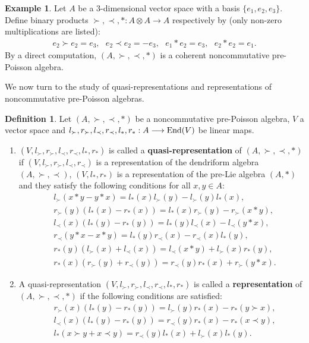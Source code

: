 \documentclass[12pt]{amsart}
\theoremstyle{definition}
\newtheorem{defi}[thm]{Definition}
\newtheorem{ex}[thm]{Example}
\begin{document}
\begin{ex} \label{Ae1}
Let $A$ be a 3-dimensional vector space with a basis $\{e_1,e_2,e_3\}$.
Define binary products $\succ,\prec,\ast:A\otimes A \longrightarrow A$ respectively by
 (only non-zero multiplications are listed):
 \begin{align*}
e_2\succ e_2=e_3, \ \ \  e_2\prec e_2=-e_3,\ \ \
e_1\ast e_2=e_3, \ \ \ e_2\ast e_2=e_1.
	\end{align*}
By a direct computation, $(A,\succ,\prec,\ast)$ is a coherent noncommutative pre-Poisson algebra.
\end{ex}

We now turn to the study of quasi-representations and representations of noncommutative pre-Poisson algebras.

\begin{defi} 
Let $(A,\succ,\prec,\ast)$ be a noncommutative pre-Poisson algebra,
$V$ a vector space and $l_{\succ},r_{\succ},l_{\prec},r_{\prec},l_{\ast},r_{\ast}: A
		\longrightarrow \hbox{End} (V)$ be linear maps. 
\begin{enumerate}
	\item
		$(V,l_{\succ},r_{\succ},l_{\prec},r_{\prec},l_{\ast},r_{\ast})$ is called a
		{\bf quasi-representation} of $(A,\succ,\prec,\ast)$ if $(V,l_{\succ},r_{\succ},l_{\prec},r_{\prec})$ is
		a representation of the dendriform algebra $(A,\succ,\prec)$, $(V,l_{\ast},r_{\ast})$ is a representation 
of the pre-Lie algebra
		$(A,\ast)$ and they satisfy the following conditions for all $x,y\in A$:
		\begin{align}&\label{r1}l_{\succ}(x\ast y-y\ast x)=l_{\ast}(x)l_{\succ}(y)-l_{\succ}(y)l_{\ast}(x),\\&
		\label{r2}r_{\succ}(y)(l_{\ast}(x)-r_{\ast}(x))=l_{\ast}(x)r_{\succ}(y)-r_{\succ}(x\ast y),\\&
		\label{r3}l_{\prec}(x)(l_{\ast}(y)-r_{\ast}(y))=l_{\ast}(y)l_{\prec}(x)-l_{\prec}(y\ast x),\\&
		\label{r4}r_{\prec}(y\ast x-x\ast y)=l_{\ast}(y)r_{\prec}(x)-r_{\prec}(x)l_{\ast}(y),
	\\&\label{r5}r_{\ast}(y)(l_{\succ}(x)+l_{\prec}(x))=l_{\prec}(x\ast y)+l_{\succ}(x)r_{\ast}(y),
\\&\label{r6}r_{\ast}(x)(r_{\succ}(y)+r_{\prec}(y))=r_{\prec}(y)r_{\ast} (x)+r_{\succ}(y\ast x).\end{align}
	\item  A quasi-representation $(V,l_{\succ},r_{\succ},l_{\prec},r_{\prec},l_{\ast},r_{\ast})$ is called a
{\bf representation} of $(A,\succ,\prec,\ast)$ if the following conditions are satisfied:
\begin{align}&\label{r7}r_{\succ}(x)(l_{\ast}(y)-r_{\ast}(y))=l_{\succ}(y)r_{\ast}(x)-r_{\ast}(y\succ x),\\&
		\label{r8}l_{\prec}(x)(l_{\ast}(y)-r_{\ast}(y))=r_{\prec}(y)r_{\ast}(x)-r_{\ast}(x\prec y),\\&
		\label{r9}l_{\ast}(x\succ y+x\prec y)=r_{\prec}(y)l_{\ast}(x)+l_{\succ}(x)l_{\ast}(y).\end{align}
\end{enumerate}
	 \end{defi}
\end{document}
